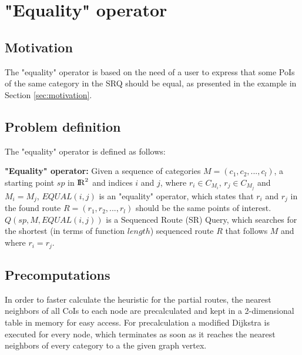 



\section{"Equality" operator}
\label{ch:EO}

\subsection{Motivation} 
The "equality" operator is based on the need of a user to express that some PoIs of the same category in the SRQ should be equal, as presented in the example in Section \ref{sec:motivation}.

\subsection{Problem definition} 
\label{sec:problemEO}
The "equality" operator is defined as follows:

\textbf{"Equality" operator:} Given a sequence of categories $M = (c_1, c_2, ..., c_l)$, a starting point $sp$ in ${\rm I\!R}^2$ and indices $i$ and $j$, where $r_i \in C_{M_{i}}$, $r_j \in C_{M_{j}}$ and $M_i = M_j$, $EQUAL(i, j)$ is an "equality" operator, which states that $r_i$ and $r_j$ in the found route $R = (r_1, r_2, ..., r_l)$ should be the same points of interest.
$Q(sp, M, EQUAL(i, j))$ is a Sequenced Route (SR) Query, which searches for the shortest (in terms of function $length$) sequenced route $R$ that follows $M$ and where $r_i = r_j$.

\subsection{Precomputations} 
\label{sec:precompEO}
In order to faster calculate the heuristic for the partial routes, the nearest neighbors of all CoIs to each node are precalculated and kept in a 2-dimensional table in memory for easy access. For precalculation a modified Dijkstra is executed for every node, which terminates as soon as it reaches the nearest neighbors of every category to a the given graph vertex.

